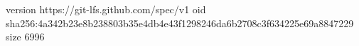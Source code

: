 version https://git-lfs.github.com/spec/v1
oid sha256:4a342b23e8b238803b35e4db4e43f1298246da6b2708c3f634225e69a8847229
size 6996
